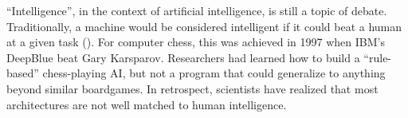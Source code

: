 
``Intelligence'', in the context of artificial intelligence, is still a topic of debate. Traditionally, a machine would be considered intelligent if it could beat a human at a given task (\cite{Chollet2019OnIntelligence}). For computer chess, this was achieved in 1997 when IBM's DeepBlue beat Gary Karsparov. Researchers had learned how to build a ``rule-based'' chess-playing AI, but not a program that could generalize to anything beyond similar boardgames. In retrospect, scientists have realized that most architectures are not well matched to human intelligence. 

